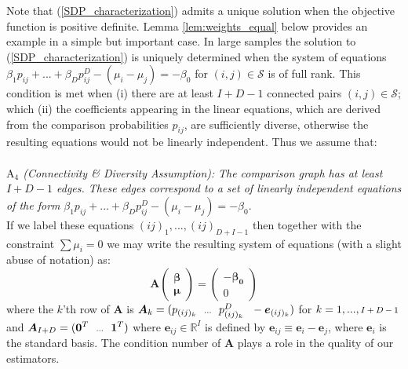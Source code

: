 \documentclass[twoside,11pt]{article}
\newcommand*{\Scale}[2][4]{\scalebox{#1}{$#2$}}%
\begin{document}
Note that (\ref{SDP_characterization}) admits a unique solution when the objective function is positive definite. Lemma \ref{lem:weights_equal} below provides an example in a simple but important case. In large samples 
the solution to (\ref{SDP_characterization}) is uniquely determined when the system of equations $\beta_1 p_{ij}+...+\beta_D p_{ij}^D - (\mu_i -\mu_j)= -\beta_0$ for $(i,j)\in \mathcal{S}$ is of full rank. This condition is met when (i) there are at least $I+D-1$ connected pairs $(i,j)\in \mathcal{S}$; which (ii) the coefficients appearing in the linear equations, which are derived from the comparison probabilities $p_{ij}$, are sufficiently diverse, otherwise the resulting equations would not be linearly independent. Thus we assume that:\\
\\
\textit{$\mathrm{A}_4$ (Connectivity \& Diversity Assumption):} \textit{The comparison graph has at least $I+D-1$ edges. These edges correspond to a set of linearly independent equations of the form} $\beta_1 p_{ij}+...+\beta_D p_{ij}^D - (\mu_i -\mu_j)= -\beta_0$. \\

If we label these equations $(ij)_1,...,(ij)_{D+I-1}$ then together with the constraint $\sum \mu_i = 0$ we may write the resulting system of equations (with a slight abuse of notation) as:
\begin{equation}
\label{eq:linear_equation}
\boldsymbol{A} \left(\begin{array}{l}
     \boldsymbol{\beta}\\
     \boldsymbol{\mu} 
\end{array}\right) = \left(\begin{array}{c}
     -\boldsymbol{\beta_0} \\
     0
\end{array}\right)
\end{equation}
where the $k$'th row of $\boldsymbol{A}$ is $\boldsymbol{A}_k = (p_{(ij)_k} \ \ \Scale[.8]{...} \ \  p_{(ij)_k}^D\ \   -\boldsymbol{e}_{(ij)_k})$  for $k = 1,..., \Scale[.8]{I+D-1}$  and $\boldsymbol{A}_{I+D} = (\boldsymbol{0}^T \ \ \Scale[.8]{...} \ \  \boldsymbol{1}^T)$
where $\boldsymbol{e}_{ij}\in \mathbb{R}^{I}$ is defined by  $\boldsymbol{e}_{ij} \equiv \boldsymbol{e}_i - \boldsymbol{e}_j$, where $\boldsymbol{e}_i$ is the standard basis. The condition number of $\boldsymbol{A}$ plays a role in the quality of our estimators. 
 
\end{document}
